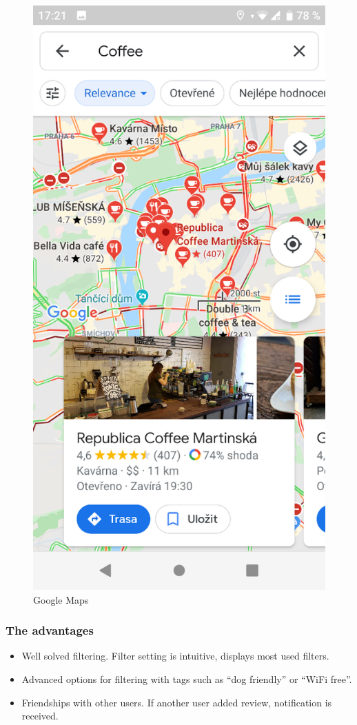 \begin{figure}[ht]
\begin{minipage}{0.45\linewidth}
        \includegraphics[width=0.75\linewidth]{img/analysis/gmaps.png}
        \caption{Google Maps \cite{app-google-maps}}
        \label{fig:google-maps}
    \end{minipage}
\end{figure}

\subsubsection{The advantages}
\begin{itemize}
    \item Well solved filtering. Filter setting is intuitive, displays most used filters. 
    \item Advanced options for filtering with tags such as ``dog friendly'' or ``WiFi free''.
    \item Friendships with other users. If another user added review, notification is received.
\end{itemize}

